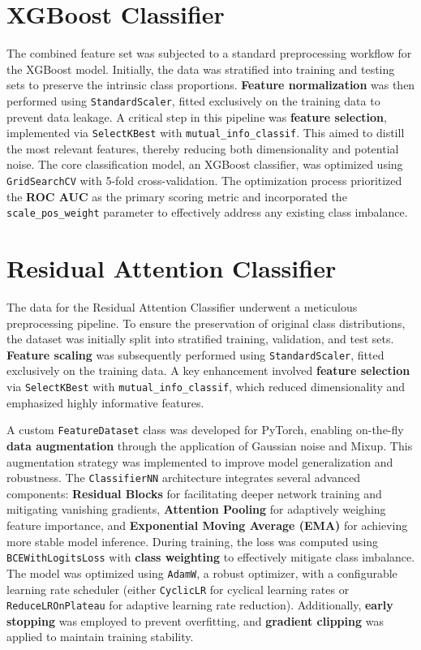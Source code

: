 \documentclass{article}
\begin{document}
\section{XGBoost Classifier}
The combined feature set was subjected to a standard preprocessing workflow for the XGBoost model. Initially, the data was stratified into training and testing sets to preserve the intrinsic class proportions. \textbf{Feature normalization} was then performed using \texttt{StandardScaler}, fitted exclusively on the training data to prevent data leakage. A critical step in this pipeline was \textbf{feature selection}, implemented via \texttt{SelectKBest} with \texttt{mutual\_info\_classif}. This aimed to distill the most relevant features, thereby reducing both dimensionality and potential noise. The core classification model, an XGBoost classifier, was optimized using \texttt{GridSearchCV} with 5-fold cross-validation. The optimization process prioritized the \textbf{ROC AUC} as the primary scoring metric and incorporated the \texttt{scale\_pos\_weight} parameter to effectively address any existing class imbalance.

\section{Residual Attention Classifier}
The data for the Residual Attention Classifier underwent a meticulous preprocessing pipeline. To ensure the preservation of original class distributions, the dataset was initially split into stratified training, validation, and test sets. \textbf{Feature scaling} was subsequently performed using \texttt{StandardScaler}, fitted exclusively on the training data. A key enhancement involved \textbf{feature selection} via \texttt{SelectKBest} with \texttt{mutual\_info\_classif}, which reduced dimensionality and emphasized highly informative features.

A custom \texttt{FeatureDataset} class was developed for PyTorch, enabling on-the-fly \textbf{data augmentation} through the application of Gaussian noise and Mixup. This augmentation strategy was implemented to improve model generalization and robustness. The \texttt{ClassifierNN} architecture integrates several advanced components: \textbf{Residual Blocks} for facilitating deeper network training and mitigating vanishing gradients, \textbf{Attention Pooling} for adaptively weighing feature importance, and \textbf{Exponential Moving Average (EMA)} for achieving more stable model inference. During training, the loss was computed using \texttt{BCEWithLogitsLoss} with \textbf{class weighting} to effectively mitigate class imbalance. The model was optimized using \texttt{AdamW}, a robust optimizer, with a configurable learning rate scheduler (either \texttt{CyclicLR} for cyclical learning rates or \texttt{ReduceLROnPlateau} for adaptive learning rate reduction). Additionally, \textbf{early stopping} was employed to prevent overfitting, and \textbf{gradient clipping} was applied to maintain training stability.
\end{document}
